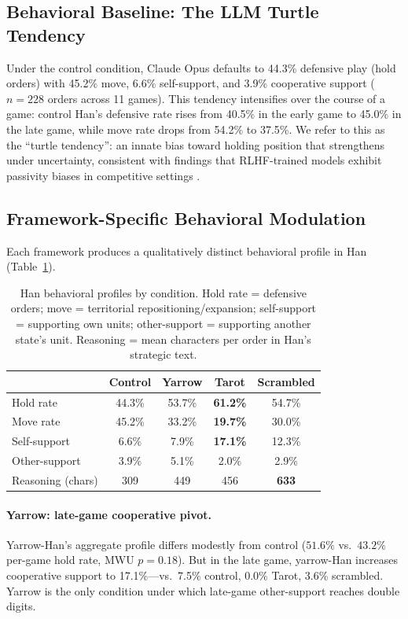 \documentclass[11pt]{article}
\begin{document}
\subsection{Behavioral Baseline: The LLM Turtle Tendency}
\label{sec:turtle}

Under the control condition, Claude Opus defaults to 44.3\% defensive play (hold orders) with 45.2\% move, 6.6\% self-support, and 3.9\% cooperative support ($n = 228$ orders across 11 games). This tendency intensifies over the course of a game: control Han's defensive rate rises from 40.5\% in the early game to 45.0\% in the late game, while move rate drops from 54.2\% to 37.5\%. We refer to this as the ``turtle tendency'': an innate bias toward holding position that strengthens under uncertainty, consistent with findings that RLHF-trained models exhibit passivity biases in competitive settings \citep{Mukobi2023welfare}.

\subsection{Framework-Specific Behavioral Modulation}
\label{sec:behavioral}

Each framework produces a qualitatively distinct behavioral profile in Han (Table~\ref{tab:behavior}).

\begin{table}[t]
\centering
\caption{Han behavioral profiles by condition. Hold rate = defensive orders; move = territorial repositioning/expansion; self-support = supporting own units; other-support = supporting another state's unit. Reasoning = mean characters per order in Han's strategic text.}
\label{tab:behavior}
\begin{tabular}{lcccc}
\toprule
& Control & Yarrow & Tarot & Scrambled \\
\midrule
Hold rate & 44.3\% & 53.7\% & \textbf{61.2\%} & 54.7\% \\
Move rate & 45.2\% & 33.2\% & \textbf{19.7\%} & 30.0\% \\
Self-support & 6.6\% & 7.9\% & \textbf{17.1\%} & 12.3\% \\
Other-support & 3.9\% & 5.1\% & 2.0\% & 2.9\% \\
Reasoning (chars) & 309 & 449 & 456 & \textbf{633} \\
\bottomrule
\end{tabular}
\end{table}

\paragraph{Yarrow: late-game cooperative pivot.} Yarrow-Han's aggregate profile differs modestly from control ($51.6\%$ vs.\ $43.2\%$ per-game hold rate, MWU $p = 0.18$). But in the late game, yarrow-Han increases cooperative support to 17.1\%---vs.\ 7.5\% control, 0.0\% Tarot, 3.6\% scrambled. Yarrow is the only condition under which late-game other-support reaches double digits.
\end{document}
